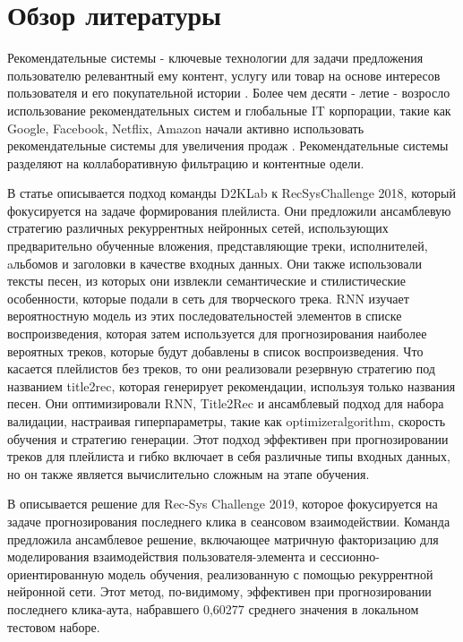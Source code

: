 \documentclass[11pt]{article}
\begin{document}
{{\section{Обзор литературы}
\label{sec:orgafcbe47}
  Рекомендательные системы - ключевые технологии для задачи предложения
пользователю релевантный ему контент, услугу или товар на основе интересов
пользователя и его покупательной истории \cite{Isinkaye_2015} . Более чем десяти - летие - возросло использование рекомендательных систем и
глобальные IT корпорации, такие как Google, Facebook, Netflix, Amazon начали
активно использовать рекомендательные системы для увеличения продаж \cite{Jallouli_2017,Jannach_2016,Pathak_2010}. 
Рекомендательные системы разделяют на коллаборативную фильтрацию и контентные
одели.\cite{Isinkaye_2015,10.7838/JSEBS.2012.17.3.085,Son_2015} 


В статье\cite{monti-2018-ensem-approac} описывается подход команды D2KLab к RecSysChallenge 2018, который фокусируется на задаче формирования
плейлиста. Они предложили ансамблевую стратегию различных рекуррентных нейронных сетей, использующих предварительно обученные вложения,
представляющие треки, исполнителей, aльбомов и заголовки в качестве входных данных. Они также использовали тексты песен, из которых они
извлекли семантические и стилистические особенности, которые подали в сеть для творческого трека. RNN изучает вероятностную модель из этих
последовательностей элементов в списке воспроизведения, которая затем используется для прогнозирования наиболее вероятных треков, которые
будут добавлены в список воспроизведения. Что касается плейлистов без треков, то они реализовали резервную стратегию под названием
title2rec, которая генерирует рекомендации, используя только названия песен. Они оптимизировали RNN, Title2Rec и ансамблевый подход для
набора валидации, настраивая гиперпараметры, такие как optimizeralgorithm, скорость обучения и стратегию генерации. Этот подход эффективен
при прогнозировании треков для плейлиста и гибко включает в себя различные типы входных данных, но он также является вычислительно сложным
на этапе обучения.

В \cite{fi2020predict} описывается решение для Rec-Sys Challenge 2019, которое фокусируется на задаче прогнозирования последнего клика в
сеансовом взаимодействии. Команда предложила ансамблевое решение, включающее матричную факторизацию для моделирования взаимодействия пользователя-элемента и сессионно-ориентированную модель обучения, реализованную с помощью рекуррентной нейронной сети. Этот метод, по-видимому, эффективен при прогнозировании последнего клика-аута, набравшего 0,60277 среднего значения в локальном тестовом наборе.



}}
\end{document}
